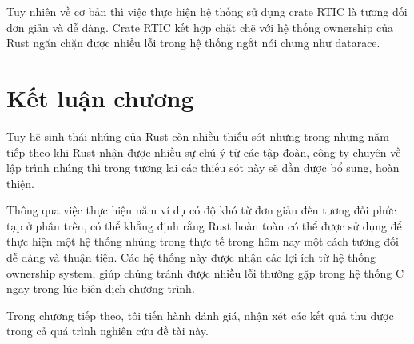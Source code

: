 Tuy nhiên về cơ bản thì việc thực hiện hệ thống sử dụng crate RTIC là tương đối đơn giản và dễ dàng.
Crate RTIC kết hợp chặt chẽ với hệ thống ownership của Rust ngăn chặn được nhiều lỗi trong hệ thống ngắt nói chung như datarace.

\section{Kết luận chương}
Tuy hệ sinh thái nhúng của Rust còn nhiều thiếu sót nhưng trong những năm tiếp theo khi Rust nhận được nhiều sự chú ý từ các tập đoàn, công ty chuyên về lập trình nhúng thì trong tương lai các thiếu sót này sẽ dần được bổ sung, hoàn thiện.

Thông qua việc thực hiện năm ví dụ có độ khó từ đơn giản đến tương đối phức tạp ở phần trên, có thể khẳng định rằng Rust hoàn toàn có thể được sử dụng để thực hiện một hệ thống nhúng trong thực tế trong hôm nay một cách tương đối dễ dàng và thuận tiện.
Các hệ thống này được nhận các lợi ích từ hệ thống ownership system, giúp chúng tránh được nhiều lỗi thường gặp trong hệ thống C ngay trong lúc biên dịch chương trình.

Trong chương tiếp theo, tôi tiến hành đánh giá, nhận xét các kết quả thu được trong cả quá trình nghiên cứu đề tài này.
